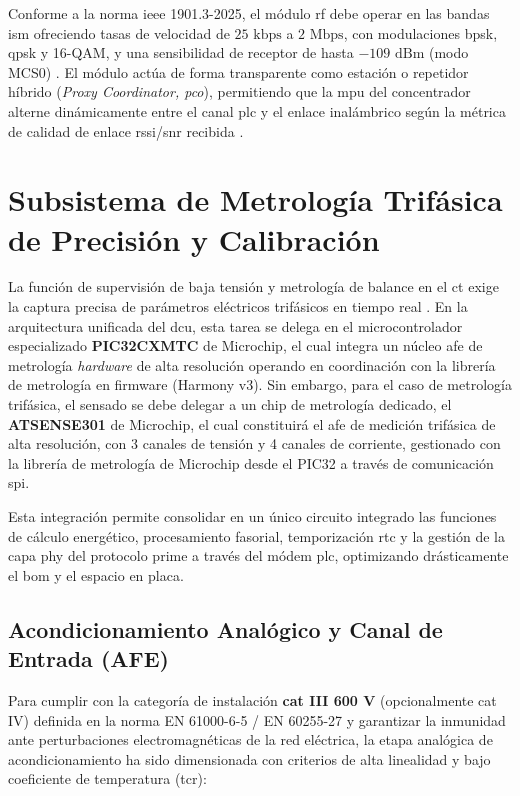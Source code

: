 Conforme a la norma \gls{ieee} 1901.3-2025, el módulo \gls{rf} debe operar en las bandas \gls{ism} ofreciendo tasas de velocidad de $25\text{ kbps}$ a $2\text{ Mbps}$, con modulaciones \gls{bpsk}, \gls{qpsk} y 16-QAM, y una sensibilidad de receptor de hasta $-109\text{ dBm}$ (modo MCS0) \cite{11267209}. El módulo actúa de forma transparente como estación o repetidor híbrido (\textit{Proxy Coordinator, \gls{pco}}), permitiendo que la \gls{mpu} del concentrador alterne dinámicamente entre el canal \gls{plc} y el enlace inalámbrico según la métrica de calidad de enlace \gls{rssi}/\gls{snr} recibida \cite{11267209}.

\section{Subsistema de Metrología Trifásica de Precisión y Calibración}
\label{sec:metrologia_trifasica}

La función de supervisión de baja tensión y metrología de balance en el \gls{ct} exige la captura precisa de parámetros eléctricos trifásicos en tiempo real \cite{10488780}. En la arquitectura unificada del \gls{dcu}, esta tarea se delega en el microcontrolador especializado \textbf{PIC32CXMTC} de Microchip, el cual integra un núcleo \gls{afe} de metrología \textit{hardware} de alta resolución operando en coordinación con la librería de metrología en firmware (Harmony v3). Sin embargo, para el caso de metrología trifásica, el sensado se debe delegar a un chip de metrología dedicado, el \textbf{ATSENSE301} de Microchip, el cual constituirá el \gls{afe} de medición trifásica de alta resolución, con 3 canales de tensión y 4 canales de corriente, gestionado con la librería de metrología de Microchip desde el PIC32 a través de comunicación \gls{spi}.

Esta integración permite consolidar en un único circuito integrado las funciones de cálculo energético, procesamiento fasorial, temporización \gls{rtc} y la gestión de la capa \gls{phy} del protocolo \gls{prime} a través del módem \gls{plc}, optimizando drásticamente el \gls{bom} y el espacio en placa.

\subsection{Acondicionamiento Analógico y Canal de Entrada (AFE)}
\label{subsec:acondicionamiento_analogo}

Para cumplir con la categoría de instalación \textbf{\gls{cat} III 600 V} (opcionalmente \gls{cat} IV) definida en la norma EN 61000-6-5 / EN 60255-27 y garantizar la inmunidad ante perturbaciones electromagnéticas de la red eléctrica, la etapa analógica de acondicionamiento ha sido dimensionada con criterios de alta linealidad y bajo coeficiente de temperatura (\gls{tcr}):

